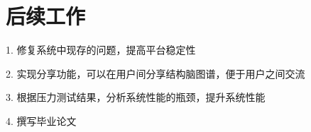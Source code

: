 \section{后续工作}
1. 修复系统中现存的问题，提高平台稳定性

2. 实现分享功能，可以在用户间分享结构脑图谱，便于用户之间交流

3. 根据压力测试结果，分析系统性能的瓶颈，提升系统性能

4. 撰写毕业论文


{
\renewcommand{\chapter}[2]{\section*{#2}\addcontentsline{toc}{section}{#2}}

}
